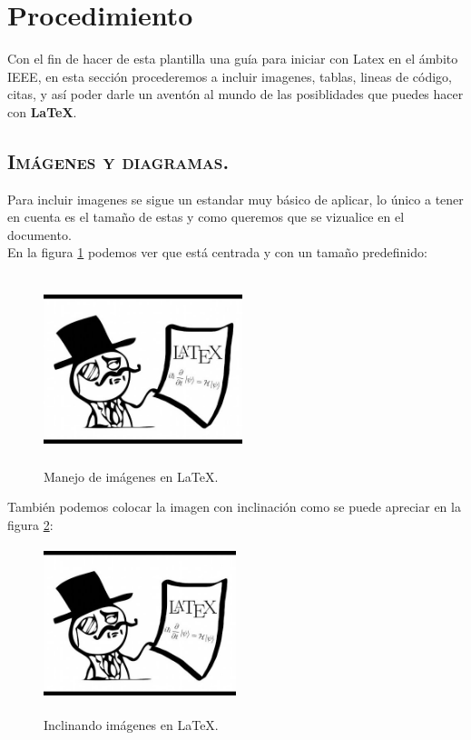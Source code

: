 \documentclass[journal, spanish]{IEEEtran}
\begin{document}
\section{Procedimiento}
Con el fin de hacer de esta plantilla una guía para iniciar con Latex en el ámbito IEEE, en esta sección procederemos a incluir imagenes, tablas, lineas de código, citas, y así poder darle un aventón al mundo de las posiblidades que puedes hacer con \textbf{\LaTeX}.
\subsection{\textsc{Imágenes y diagramas.}}
Para incluir imagenes se sigue un estandar muy básico de aplicar, lo único a tener en cuenta es el tamaño de estas y como queremos que se vizualice en el documento.\\

\noindent En la figura \ref{fig:led_Frit} podemos ver que está centrada y con un tamaño predefinido:
\begin{figure}[H]%
    \begin {center}
        \includegraphics[width=5.8cm, height=5.5cm]{Images/Latex.jpeg}
        \caption{Manejo de imágenes en LaTeX.}
        \label{fig:led_Frit}
    \end {center}
\end{figure}

\noindent También podemos colocar la imagen con inclinación como se puede apreciar en la figura \ref{fig:images}:
\begin{figure}[H]%
    \centering
    \caption{Inclinando imágenes en LaTeX.}
    \includegraphics[width=5.6cm, height=4.45cm, angle=180]{Images/Latex.jpeg}
    \label{fig:images}
\end{figure}
\end{document}
